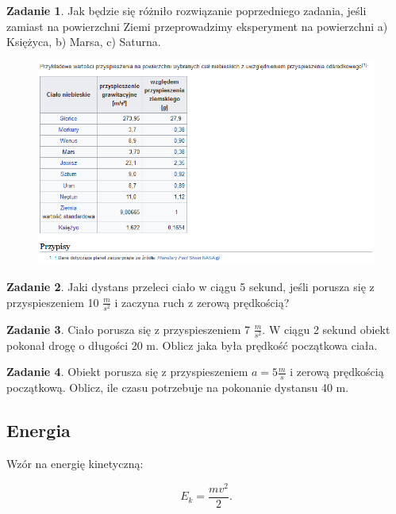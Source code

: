 \documentclass[11pt]{article}
\theoremstyle{definition}
\newtheorem{zad}{Zadanie}
\numberwithin{zad}{section}
\begin{document}
\begin{zad}
Jak będzie się różniło rozwiązanie poprzedniego zadania, jeśli zamiast na powierzchni Ziemi przeprowadzimy eksperyment na powierzchni a) Księżyca, b) Marsa, c) Saturna.

\begin{figure}[h]
\centering
\includegraphics[width=1\linewidth]{przyspieszenia.png}
\end{figure}
\end{zad}

\begin{zad}
Jaki dystans przeleci ciało w ciągu 5 sekund, jeśli porusza się z przyspieszeniem 10 $\frac{m}{s^2}$ i zaczyna ruch z zerową prędkością?
\end{zad}

\begin{zad}
Ciało porusza się z przyspieszeniem 7 $\frac m{s^2}$. W ciągu 2 sekund obiekt pokonał drogę o długości 20 m. Oblicz jaka była prędkość początkowa ciała.
\end{zad}

\begin{zad}
Obiekt porusza się z przyspieszeniem $a=5 \frac ms$ i zerową prędkością początkową. Oblicz, ile czasu potrzebuje na pokonanie dystansu 40 m.
\end{zad}

\subsection{Energia}

Wzór na energię kinetyczną:

\begin{equation}
E_k = \frac{mv^2}2.
\end{equation}
\end{document}
